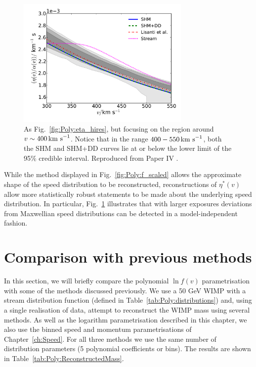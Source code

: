 \begin{figure}[t]
\centering
  \includegraphics[width=0.75\textwidth]{Poly/LIS_hires_zoom.pdf}
  \caption[As Fig.~\ref{fig:Poly:eta_hires}, but focusing on the region around $v \sim 400 \kms$]{As Fig.~\ref{fig:Poly:eta_hires}, but focusing on the region around $v \sim 400 \kms$. Notice that in the range $400-550 \,\textrm{km s}^{-1}$, both the SHM and SHM+DD curves lie at or below the lower limit of the 95\% credible interval. Reproduced from Paper IV \cite{Kavanagh:2014}.}
  \label{fig:Poly:eta_hires_zoom}
\end{figure}

While the method displayed in Fig.~\ref{fig:Poly:f_scaled} allows the approximate shape of the speed distribution to be reconstructed, reconstructions of $\eta^*(v)$ allow more statistically robust statements to be made about the underlying speed distribution. In particular, Fig.~\ref{fig:Poly:eta_hires_zoom} illustrates that with larger exposures deviations from Maxwellian speed distributions can be detected in a model-independent fashion.

\section{Comparison with previous methods}

In this section, we will briefly compare the polynomial $\ln f(v)$ parametrisation with some of the methods discussed previously. We use a 50 GeV WIMP with a stream distribution function (defined in Table~\ref{tab:Poly:distributions}) and, using a single realisation of data, attempt to reconstruct the WIMP mass using several methods. As well as the logarithm parametrisation described in this chapter, we also use the binned speed and momentum parametrisations of Chapter~\ref{ch:Speed}. For all three methods we use the same number of distribution parameters (5 polynomial coefficients or bins). The results are shown in Table~\ref{tab:Poly:ReconstructedMass}. 

